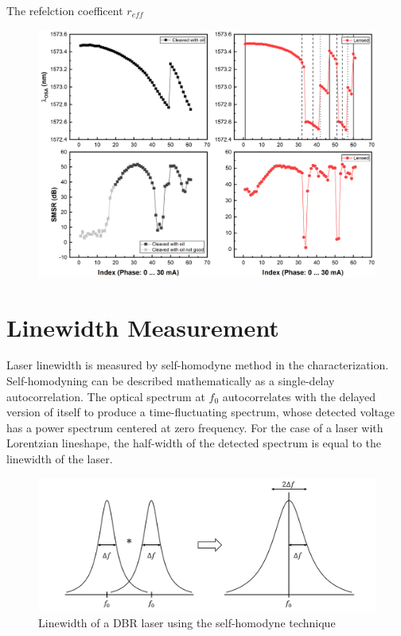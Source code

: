 The refelction coefficent $r_{eff}$
\begin{figure}[ht]
    \centering
    \includegraphics[width=\linewidth]{figures/OSA_and_SMSR.png}
    \caption{}
    \label{OSA_and_SMSR}
\end{figure}

\section{Linewidth Measurement}\label{sec:linewidth_measurement}
Laser linewidth is measured by self-homodyne method in the characterization. Self-homodyning can be described mathematically as a single-delay autocorrelation. The optical spectrum at $f_0$ autocorrelates with the delayed version of itself to produce a time-fluctuating spectrum, whose detected voltage has a power spectrum centered at zero frequency. For the case of a laser with Lorentzian lineshape, the half-width of the detected spectrum is equal to the linewidth of the laser.
\begin{figure}[ht]
    \centering
    \includegraphics[width=.8\linewidth]{figures/self-homodyne.png}
    \caption{Linewidth of a DBR laser using the self-homodyne technique}
    \label{self-homodyne}
\end{figure}

